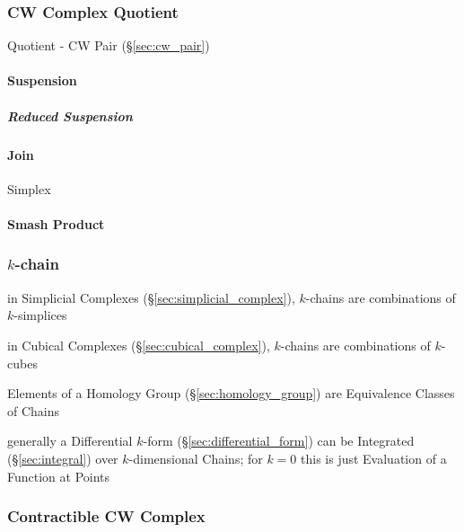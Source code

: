 \subsubsection{CW Complex Quotient}\label{sec:cwcomplex_quotient}

Quotient - CW Pair (\S\ref{sec:cw_pair})



\paragraph{Suspension}\label{sec:suspension}\hfill

\subparagraph{Reduced Suspension}\label{sec:reduced_suspension}\hfill



\paragraph{Join}\label{sec:join}\hfill

Simplex %



\paragraph{Smash Product}\label{sec:smash_product}\hfill



\subsubsection{$k$-chain}\label{sec:k_chain}

in Simplicial Complexes (\S\ref{sec:simplicial_complex}), $k$-chains are
combinations of $k$-simplices

in Cubical Complexes (\S\ref{sec:cubical_complex}), $k$-chains are
combinations of $k$-cubes

Elements of a Homology Group (\S\ref{sec:homology_group}) are Equivalence
Classes of Chains

generally a Differential $k$-form (\S\ref{sec:differential_form}) can be
Integrated (\S\ref{sec:integral}) over $k$-dimensional Chains; for $k=0$ this is
just Evaluation of a Function at Points



\subsubsection{Contractible CW Complex}
\label{sec:contractible_cwcomplex}

